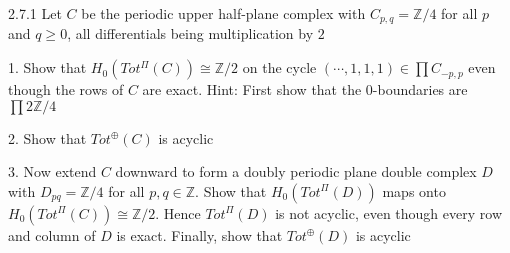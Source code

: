 \documentclass[../main.tex]{subfiles}
\begin{document}
\begin{customexercise}{2.7.1}
Let $C$ be the periodic upper half-plane complex with $C_{p,q}=\mathbb Z/4$ for all $p$ and $q\geq0$, all differentials being multiplication by $2$
\begin{center}
\end{center}
1. Show that $H_0(Tot^\Pi(C))\cong\mathbb Z/2$ on the cycle $(\cdots,1,1,1)\in\prod C_{-p,p}$ even though the rows of $C$ are exact. Hint: First show that the $0$-boundaries are $\prod2\mathbb Z/4$ \par
2. Show that $Tot^\oplus(C)$ is acyclic \par
3. Now extend $C$ downward to form a doubly periodic plane double complex $D$ with $D_{pq}=\mathbb Z/4$ for all $p,q\in\mathbb Z$. Show that $H_0(Tot^\Pi(D))$ maps onto $H_0(Tot^\Pi(C))\cong\mathbb Z/2$. Hence $Tot^\Pi(D)$ is not acyclic, even though every row and column of $D$ is exact. Finally, show that $Tot^\oplus(D)$ is acyclic
\end{customexercise}
\end{document}
